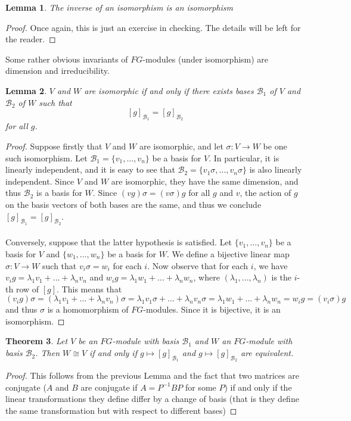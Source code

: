 \documentclass[11pt, notitlepage]{article}
\numberwithin{equation}{section}
\theoremstyle{plain}
\newtheorem{theorem}{Theorem}[section]
\newtheorem{lemma}[theorem]{Lemma}
\theoremstyle{definition}
\newcommand{\mcl}{\mathcal}
\begin{document}
\begin{lemma}
	The inverse of an isomorphism is an isomorphism
\end{lemma}
\begin{proof}
	Once again, this is just an exercise in checking. The details will be left for the reader.
\end{proof}
Some rather obvious invariants of $FG$-modules (under isomorphism) are dimension and irreducibility.
\begin{lemma}
	$V$ and $W$ are isomorphic if and only if there exists bases $\mathcal{B}_1$ of $V$ and $\mathcal{B}_2$ of $W$ such that $$[g]_{\mathcal{B}_1} = [g]_{\mathcal{B}_2}$$ for all $g$.
\end{lemma}
\begin{proof}
	Suppose firstly that $V$ and $W$ are isomorphic, and let $\sigma: V \rightarrow W$ be one such isomorphism. Let $\mathcal{B}_1 = \{v_1,...,v_n\}$ be a basis for $V$. In particular, it is linearly independent, and it is easy to see that $\mathcal{B}_2 = \{v_1\sigma,...,v_n\sigma\}$ is also linearly independent. Since $V$ and $W$ are isomorphic, they have the same dimension, and thus $\mathcal{B}_2$ is a basis for $W$. Since $(vg)\sigma = (v\sigma)g$ for all $g$ and $v$, the action of $g$ on the basis vectors of both bases are the same, and thus we conclude $[g]_{\mathcal{B}_1} = [g]_{\mathcal{B}_2}$.
	\\\\
	Conversely, suppose that the latter hypothesis is satisfied. Let $\{v_1,...,v_n\}$ be a basis for $V$ and $\{w_1,...,w_n\}$ be a basis for $W$. We define a bijective linear map $\sigma: V \rightarrow W$ such that $v_i \sigma = w_i$ for each $i$. Now observe that for each $i$, we have  $v_ig = \lambda_1 v_1 + ... + \lambda_n v_n$ and $w_ig = \lambda_1 w_1 +...+ \lambda_n w_n$, where $(\lambda_1,...,\lambda_n)$ is the $i$-th row of $[g]$. This means that $$(v_ig)\sigma = (\lambda_1 v_1 + ... + \lambda_n v_n)\sigma = \lambda_1 v_1\sigma + ... + \lambda_n v_n\sigma = \lambda_1 w_1 +...+ \lambda_n w_n = w_ig = (v_i\sigma)g$$ and thus $\sigma$ is a homomorphism of $FG$-modules. Since it is bijective, it is an isomorphism.
\end{proof}
\begin{theorem}
	Let $V$ be an $FG$-module with basis $\mcl{B}_1$ and $W$ an $FG$-module with basis $\mcl{B}_2$. Then $W \cong V$ if and only if $g\mapsto [g]_{\mcl{B}_1}$ and $g\mapsto [g]_{\mcl{B}_2}$ are equivalent.
\end{theorem}
\begin{proof}
	This follows from the previous Lemma and the fact that two matrices are conjugate ($A$ and $B$ are conjugate if $A = P^{-1}B P$ for some $P$) if and only if the linear transformations they define differ by a change of basis (that is they define the same transformation but with respect to different bases)
\end{proof}
\end{document}
